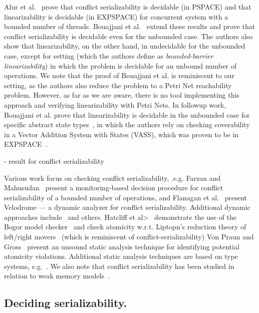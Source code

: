 Alur et al.~\cite{AlMcPe96} prove that conflict serializability is decidable 
(in PSPACE) and that linearizability is decidable (in EXPSPACE) for concurrent 
system with a bounded number of threads.
%
Bouajjani et al.~\cite{BoEmEnHa13} extend these results and prove that conflict serializability is decidable even for the unbounded case. The authors also show that linearizability, on the other hand, in undecidable for the unbounded case, except for setting (which the authors define as \textit{bounded-barrier linearizability}) in which the problem is decidable for an unbound number of operations.
%
We note that the proof of Bouajjani et al. is reminiscent to our setting, as the authors also reduce the problem to a Petri Net reachability problem.
%
However, as far as we are aware, there is no tool implementing this approach and verifying linearizability with Petri Nets.
%
In followup work, Bouajjani et al. prove that linearizability is decidable in 
the unbounded case for specific abstract state types~\cite{BoEmEnHa18}, in 
which the authors rely on checking coverability in a Vector Addition System 
with States (VASS), which was proven to be in EXPSPACE~\cite{Ra78}.

- result for conflict serializability

Various work focus on checking conflict serializability, .e.g. Farzan and Mahusudan~\cite{FaMa08} present a monitoring-based decision procedure for conflict serializability of a bounded number of operations, and Flanagan et al.~\cite{FlFrYi08} present Velodrome --- a dynamic analyzer for conflict serializability. Additional dynamic approaches include~\cite{FlFr04, XuBoRa05, WaSt06a, CoOlPnTuZu07, EmMaMa10, SiMaWaGu11a} and others.
%
%
Hatcliff et al>~\cite{HaRoDw04} demonstrate the use of the Bogor model checker~\cite{RoDwHa03} and check atomicity w.r.t. Liptopn's reduction theory of left/right movers~\cite{Li75} (which is reminiscent of conflict-serializability)
%
Von Praun and Gross~\cite{VoGr04} present an unsound static analysis technique for identifying potential atomicity violations. Additional static analysis techniques are based on type systems, e.g.~\cite{FlQa03, FlFrLiQa08}.
%
We also note that conflict serializability has been studied in relation to weak memory models~\cite{EnFa16}.




\subsection{Deciding serializability.}
\label{sec:related:deciding-serializability}

